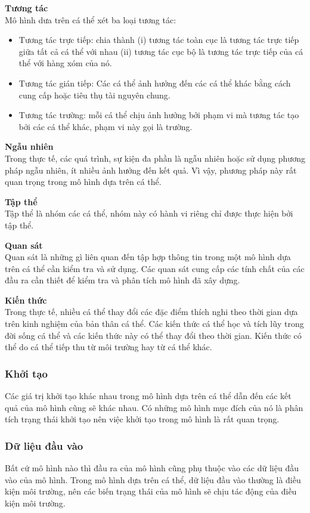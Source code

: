 \documentclass[13pt]{extreport}
\begin{document}
\textbf{Tương tác}\\
Mô hình dưa trên cá thể xét ba loại tương tác:
\begin{itemize}
\item Tương tác trực tiếp: chia thành (i) tương tác toàn cục là tương tác trực tiếp giữa tất cả cá thể với nhau (ii) tương tác cục bộ  là tương tác trực tiếp của cá thể với hàng xóm của nó.
\item Tương tác gián tiếp: Các cá thể ảnh hưởng đến các cá thể khác bằng cách cung cấp hoặc tiêu thụ tài nguyên chung.
\item Tương tác trường: mỗi cá thể chịu ảnh hưởng bởi phạm vi mà tương tác tạo bởi các cá thể khác, phạm vi này gọi là trường.
\end{itemize}
\textbf{Ngẫu nhiên}\\
Trong thực tế, các quá trình, sự kiện đa phần là ngẫu nhiên hoặc sử dụng phương pháp ngẫu nhiên, ít nhiều ảnh hưởng đến kết quả. Vì vậy, phương pháp này rất quan trọng trong mô hình dựa trên cá thể.

\textbf{Tập thể}\\
Tập thể là nhóm các cá thể, nhóm này có hành vi riêng chỉ được thực hiện bởi tập thể.

\textbf{Quan sát}\\
Quan sát là những gì liên quan đến tập hợp thông tin trong một mô hình dựa trên cá thể cần kiểm tra và sử dụng. Các quan sát cung cấp các tính chất của các đầu ra cần thiết để kiểm tra và phân tích mô hình đã xây dựng.

\textbf{Kiến thức}\\
Trong thực tế, nhiều cá thể thay đổi các đặc điểm thích nghi theo thời gian dựa trên kinh nghiệm của bản thân cá thể. Các kiến thức cá thể học và tích lũy trong đời sống cá thể và các kiến thức này có thể thay đổi theo thời gian. Kiến thức có thể do cá thể tiếp thu từ môi trường hay từ cá thể khác.

\subsubsection{Khởi tạo}
Các giá trị khởi tạo khác nhau trong mô hình dựa trên cá thể dẫn đến các kết quả của mô hình cũng sẽ khác nhau. Có những mô hình mục đích của nó là phân tích trạng thái khởi tạo nên việc khởi tạo trong mô hình là rất quan trọng.

\subsubsection{Dữ liệu đầu vào}
Bất cứ mô hình nào thì đầu ra của mô hình cũng phụ thuộc vào các dữ liệu đầu vào của mô hình. Trong mô hình dựa trên cá thể, dữ liệu đầu vào thường là điều kiện môi trường, nên các biến trạng thái của mô hình sẽ chịu tác động của điều kiện môi trường.
\end{document}
